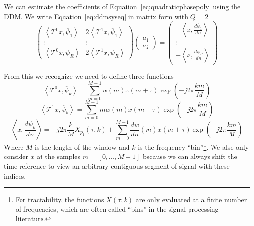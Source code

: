 We can estimate the coefficients of Equation~\ref{eq:quadraticphasepoly} using
the DDM. We write Equation~\ref{eq:ddmsyseq} in matrix form with $Q=2$
\begin{equation}
    \begin{pmatrix}
        \left\langle \mathcal{T}^{0} x , \overline{\psi}_{1} \right\rangle &
        2\left\langle \mathcal{T}^{1} x , \overline{\psi}_{1} \right\rangle \\
        \vdots & \vdots \\
        \left\langle \mathcal{T}^{0} x , \overline{\psi}_{R} \right\rangle & 
        2\left\langle \mathcal{T}^{1} x , \overline{\psi}_{R} \right\rangle
    \end{pmatrix}
    \begin{pmatrix}
        a_{1} \\
        a_{2}
    \end{pmatrix}
    =
    \begin{pmatrix}
        -\left\langle  x , \frac{d\overline{\psi}_{1}}{dn} \right\rangle \\
        \vdots \\
        -\left\langle  x , \frac{d\overline{\psi}_{R}}{dn} \right\rangle
    \end{pmatrix}
\end{equation}

From this we recognize we need to define three functions
\begin{equation}
    \left\langle \mathcal{T}^{0} x , \overline{\psi}_{k} \right\rangle 
    =
    \sum_{m=0}^{M-1} w(m) x(m + \tau) \exp(-j 2 \pi \frac{k m}{M})
\end{equation}
\begin{equation}
    \left\langle \mathcal{T}^{1} x , \overline{\psi}_{k} \right\rangle
    =
    \sum_{m=0}^{M-1} m w(m) x(m + \tau) \exp(-j 2 \pi \frac{k m}{M})
\end{equation}
\begin{equation}
    \left\langle  x , \frac{d\overline{\psi}_{k}}{dn} \right\rangle
    =
    -j 2 \pi \frac{k}{M} X_{p_{1}} \left( \tau , k \right) + 
    \sum_{m=0}^{M-1} \frac{dw}{dn}(m) x(m + \tau) \exp(-j 2 \pi \frac{k m}{M})
\end{equation}
Where $M$ is the length of the window and $k$ is the frequency
``bin''\footnote{For tractability, the functions $X(\tau,k)$ are only evaluated at
    a finite number of frequencies, which are often called ``bins'' in the
signal processing literature.}. We also
only consider $x$ at the samples $m = [0, \dotsc, M-1]$ because we can always
shift the time reference to view an arbitrary contiguous segment of signal with
these indices.

